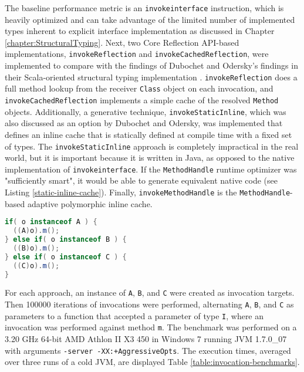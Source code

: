 The baseline performance metric is an \texttt{invokeinterface} instruction, which is heavily optimized and can take advantage of the limited number of implemented types inherent to explicit interface implementation as discussed in Chapter \ref{chapter:StructuralTyping}.  Next, two Core Reflection API-based implementations, \texttt{invokeReflection} and \texttt{invokeCachedReflection}, were implemented to compare with the findings of Dubochet and Odersky's findings in their Scala-oriented structural typing implementation \cite{structural-types-scala}.  \texttt{invokeReflection} does a full method lookup from the receiver \texttt{Class} object on each invocation, and \texttt{invokeCachedReflection} implements a simple cache of the resolved \texttt{Method} objects.  Additionally, a generative technique, \texttt{invokeStaticInline}, which was also discussed as an option by Dubochet and Odersky, was implemented that defines an inline cache that is statically defined at compile time with a fixed set of types.  The \texttt{invokeStaticInline} approach is completely impractical in the real world, but it is important because it is written in Java, as opposed to the native implementation of \texttt{invokeinterface}.  If the \texttt{MethodHandle} runtime optimizer was "sufficiently smart", it would be able to generate equivalent native code (see Listing \ref{static-inline-cache}).  Finally, \texttt{invokeMethodHandle} is the \texttt{MethodHandle}-based adaptive polymorphic inline cache.
\vspace{6em}
\begin{lstlisting}[language=Java,caption=Static inline cache,label=static-inline-cache]
if( o instanceof A ) {
  ((A)o).m();
} else if( o instanceof B ) {
  ((B)o).m();	
} else if( o instanceof C ) {
  ((C)o).m();
}
\end{lstlisting}

For each approach, an instance of \texttt{A}, \texttt{B}, and \texttt{C} were created as invocation targets.  Then 100000 iterations of invocations were performed, alternating \texttt{A}, \texttt{B}, and \texttt{C} as parameters to a function that accepted a parameter of type \texttt{I}, where an invocation was performed against method \texttt{m}.  The benchmark was performed on a 3.20 GHz 64-bit AMD Athlon II X3 450 in Windows 7 running JVM 1.7.0\_07 with arguments \texttt{-server -XX:+AggressiveOpts}.  The execution times, averaged over three runs of a cold JVM, are displayed Table \ref{table:invocation-benchmarks}.

